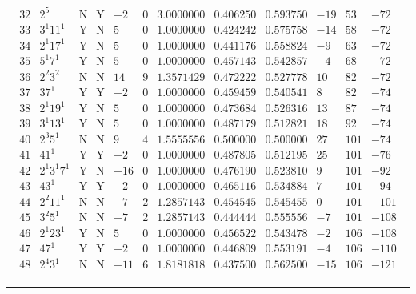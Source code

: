 \documentclass[11pt,reqno,a4letter]{article}
\numberwithin{figure}{section}
\numberwithin{table}{section}
\theoremstyle{plain}
\numberwithin{theorem}{section}
\theoremstyle{definition}
\begin{document}
\begin{table}[h!]
\begin{equation*}
{\begin{array}{cc|cc|ccc|cc|ccc}
 32 & 2^5 & \text{N} & \text{Y} & -2 & 0 & 3.0000000 & 0.406250 & 0.593750 & -19 & 53 & -72 \\
 33 & 3^1 11^1 & \text{Y} & \text{N} & 5 & 0 & 1.0000000 & 0.424242 & 0.575758 & -14 & 58 & -72 \\
 34 & 2^1 17^1 & \text{Y} & \text{N} & 5 & 0 & 1.0000000 & 0.441176 & 0.558824 & -9 & 63 & -72 \\
 35 & 5^1 7^1 & \text{Y} & \text{N} & 5 & 0 & 1.0000000 & 0.457143 & 0.542857 & -4 & 68 & -72 \\
 36 & 2^2 3^2 & \text{N} & \text{N} & 14 & 9 & 1.3571429 & 0.472222 & 0.527778 & 10 & 82 & -72 \\
 37 & 37^1 & \text{Y} & \text{Y} & -2 & 0 & 1.0000000 & 0.459459 & 0.540541 & 8 & 82 & -74 \\
 38 & 2^1 19^1 & \text{Y} & \text{N} & 5 & 0 & 1.0000000 & 0.473684 & 0.526316 & 13 & 87 & -74 \\
 39 & 3^1 13^1 & \text{Y} & \text{N} & 5 & 0 & 1.0000000 & 0.487179 & 0.512821 & 18 & 92 & -74 \\
 40 & 2^3 5^1 & \text{N} & \text{N} & 9 & 4 & 1.5555556 & 0.500000 & 0.500000 & 27 & 101 & -74 \\
 41 & 41^1 & \text{Y} & \text{Y} & -2 & 0 & 1.0000000 & 0.487805 & 0.512195 & 25 & 101 & -76 \\
 42 & 2^1 3^1 7^1 & \text{Y} & \text{N} & -16 & 0 & 1.0000000 & 0.476190 & 0.523810 & 9 & 101 & -92 \\
 43 & 43^1 & \text{Y} & \text{Y} & -2 & 0 & 1.0000000 & 0.465116 & 0.534884 & 7 & 101 & -94 \\
 44 & 2^2 11^1 & \text{N} & \text{N} & -7 & 2 & 1.2857143 & 0.454545 & 0.545455 & 0 & 101 & -101 \\
 45 & 3^2 5^1 & \text{N} & \text{N} & -7 & 2 & 1.2857143 & 0.444444 & 0.555556 & -7 & 101 & -108 \\
 46 & 2^1 23^1 & \text{Y} & \text{N} & 5 & 0 & 1.0000000 & 0.456522 & 0.543478 & -2 & 106 & -108 \\
 47 & 47^1 & \text{Y} & \text{Y} & -2 & 0 & 1.0000000 & 0.446809 & 0.553191 & -4 & 106 & -110 \\
 48 & 2^4 3^1 & \text{N} & \text{N} & -11 & 6 & 1.8181818 & 0.437500 & 0.562500 & -15 & 106 & -121 \\ 
\end{array}
}
\end{equation*}

\bigskip\hrule\smallskip 


\end{table}
\end{document}
